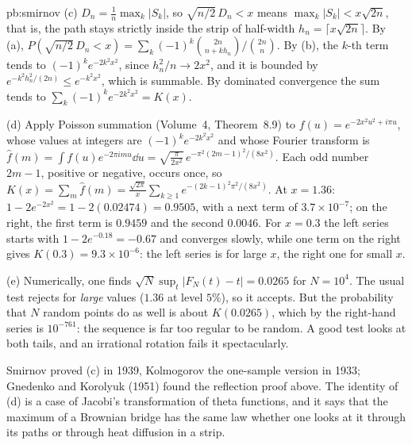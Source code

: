 \begin{solution}{pb:smirnov}
(c) $D_n=\frac1n\max_k|S_k|$, so $\sqrt{n/2}\,D_n<x$ means $\max_k|S_k|<x\sqrt{2n}$, that is, the path stays strictly inside the strip of half-width $h_n=\lceil x\sqrt{2n}\rceil$.
By (a), $P(\sqrt{n/2}\,D_n<x)=\sum_k(-1)^k\binom{2n}{n+kh_n}\big/\binom{2n}n$. By (b), the $k$-th term tends to $(-1)^ke^{-2k^2x^2}$, since $h_n^2/n\to2x^2$, and it is bounded by
$e^{-k^2h_n^2/(2n)}\le e^{-k^2x^2}$, which is summable. By dominated convergence the sum tends to $\sum_k(-1)^ke^{-2k^2x^2}=K(x)$.

(d) Apply Poisson summation (Volume~4, Theorem~8.9) to $f(u)=e^{-2x^2u^2+i\pi u}$, whose values at integers are $(-1)^ke^{-2k^2x^2}$ and whose Fourier transform is
$\hat f(m)=\int f(u)e^{-2\pi imu}\dd u=\sqrt{\frac\pi{2x^2}}\,e^{-\pi^2(2m-1)^2/(8x^2)}$. Each odd number $2m-1$, positive or negative, occurs once, so
$K(x)=\sum_m\hat f(m)=\frac{\sqrt{2\pi}}x\sum_{k\ge1}e^{-(2k-1)^2\pi^2/(8x^2)}$. At $x=1.36$: $1-2e^{-2x^2}=1-2(0.02474)=0.9505$, with a next term of $3.7\times10^{-7}$; on the
right, the first term is $0.9459$ and the second $0.0046$. For $x=0.3$ the left series starts with $1-2e^{-0.18}=-0.67$ and converges slowly, while one term on the right gives
$K(0.3)=9.3\times10^{-6}$: the left series is for large $x$, the right one for small $x$.

(e) Numerically, one finds $\sqrt N\sup_t|F_N(t)-t|=0.0265$ for $N=10^4$. The usual test rejects for \emph{large} values ($1.36$ at level $5\%$), so it accepts. But the probability
that $N$ random points do as well is about $K(0.0265)$, which by the right-hand series is $10^{-761}$: the sequence is far too regular to be random. A good test looks at both
tails, and an irrational rotation fails it spectacularly.

\leads Smirnov proved (c) in 1939, Kolmogorov the one-sample version in 1933; Gnedenko and Korolyuk (1951) found the reflection proof above. The identity of (d) is a
case of Jacobi's transformation of theta functions, and it says that the maximum of a Brownian bridge has the same law whether one looks at it through its
paths or through heat diffusion in a strip.
\end{solution}

